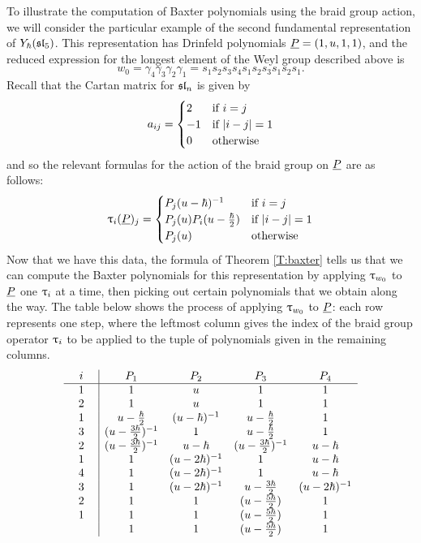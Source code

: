 To illustrate the computation of Baxter polynomials using the braid group action, we will consider the particular example of the second fundamental representation of $Y_\hbar(\mathfrak{sl}_5)$.
This representation has Drinfeld polynomials $\underline{P} = (1, u, 1, 1)$, and the reduced expression for the longest element of the Weyl group described above is
\[w_0 = \gamma_4\gamma_3\gamma_2\gamma_1 = s_1s_2s_3s_4s_1s_2s_3s_1s_2s_1.\]
Recall that the Cartan matrix for $\mathfrak{sl}_n$ is given by
\[a_{ij} =
\begin{cases}
    2 & \text{if } i=j \\
    -1 & \text{if } \lvert i-j\rvert=1 \\
    0 & \text{otherwise}
\end{cases}\]
and so the relevant formulas for the action of the braid group on $\underline{P}$ are as follows:
\[\uptau_i(\underline{P})_j =
\begin{cases}
    P_j(u-\hbar)^{-1} & \text{if } i=j \\
    P_j(u)P_i(u-\frac{\hbar}{2}) & \text{if } \lvert i-j\rvert=1 \\
    P_j(u) & \text{otherwise}
\end{cases}\]
Now that we have this data, the formula of Theorem \ref{T:baxter} tells us that we can compute the Baxter polynomials for this representation by applying $\uptau_{w_0}$ to $\underline{P}$ one $\uptau_i$ at a time, then picking out certain polynomials that we obtain along the way.
The table below shows the process of applying $\uptau_{w_0}$ to $\underline{P}$: each row represents one step, where the leftmost column gives the index of the braid group operator $\uptau_i$ to be applied to the tuple of polynomials given in the remaining columns.
\[\begin{array}{c|cccc}
    \hphantom{m}i\hphantom{m} & P_1 & P_2 & P_3 & P_4 \\
    \hline
    1 & 1 & u & 1 & 1 \\
    2 & 1 & u & 1 & 1 \\
    1 & u-\frac{\hbar}{2} & (u-\hbar)^{-1} & u-\frac{\hbar}{2} & 1 \\
    3 & (u-\frac{3\hbar}{2})^{-1} & 1 & u-\frac{\hbar}{2} & 1 \\
    2 & (u-\frac{3\hbar}{2})^{-1} & u-\hbar & (u-\frac{3\hbar}{2})^{-1} & u-\hbar \\
    1 & 1 & (u-2\hbar)^{-1} & 1 & u-\hbar \\
    4 & 1 & (u-2\hbar)^{-1} & 1 & u-\hbar \\
    3 & 1 & (u-2\hbar)^{-1} & u-\frac{3\hbar}{2} & (u-2\hbar)^{-1} \\
    2 & 1 & 1 & (u-\frac{5\hbar}{2}) & 1 \\
    1 & 1 & 1 & (u-\frac{5\hbar}{2}) & 1 \\
    & 1 & 1 & (u-\frac{5\hbar}{2}) & 1
\end{array}\]
